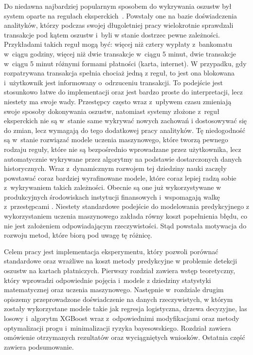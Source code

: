 \documentclass[inzynierska]{pwr_wmat_praca_dyplomowa}
\theoremstyle{plain}
\numberwithin{theorem}{chapter}
\theoremstyle{definition}
\numberwithin{theorem}{chapter}
\begin{document}
Do niedawna najbardziej popularnym sposobem do wykrywania oszustw był system oparte na regułach eksperckich~\cite{bahnsen_presentation}. Powstały one na bazie doświadczenia analityków, którzy podczas swojej długoletniej pracy wielokrotnie sprawdzali transakcje pod kątem oszustw i~byli w stanie dostrzec pewne zależności. Przykładami takich reguł mogą być: więcej niż cztery wypłaty z~bankomatu w~ciągu godziny, więcej niż dwie transakcje w~ciągu 5 minut, dwie transakcje w~ciągu 5 minut różnymi formami płatności (karta, internet). W przypadku, gdy rozpatrywana transakcja spełnia chociaż jedną z reguł, to jest ona blokowana i~użytkownik jest informowany o~odrzuceniu transakcji. To podejście jest stosunkowo łatwe do implementacji oraz jest bardzo proste do interpretacji, lecz niestety ma swoje wady. Przestępcy często wraz z~upływem czasu zmieniają swoje sposoby dokonywania oszustw, natomiast systemy złożone z~reguł eksperckich nie są w~stanie same wykrywać nowych zachowań i dostosowywać się do zmian, lecz wymagają do tego dodatkowej pracy analityków. Tę niedogodność są w~stanie rozwiązać modele uczenia maszynowego, które tworzą pewnego rodzaju reguły, które nie są bezpośrednio wprowadzane przez użytkownika, lecz automatycznie wykrywane przez algorytmy na podstawie dostarczonych danych historycznych. Wraz z~dynamicznym rozwojem tej dziedziny nauki zaczęły powstawać coraz bardziej wyrafinowane modele, które coraz lepiej radzą sobie z~wykrywaniem takich zależności. Obecnie są one już wykorzystywane w produkcyjnych środowiskach instytucji finansowych i~wspomagają walkę z~przestępcami \cite{practitioner_perspective}. Niestety standardowe podejście do modelowania predykcyjnego z wykorzystaniem uczenia maszynowego zakłada równy koszt popełnienia błędu, co nie jest założeniem odpowiadającym rzeczywistości. Stąd powstała motywacja do rozwoju metod, które biorą pod uwagę tę różnicę.

Celem pracy jest implementacja eksperymentu, który pozwoli porównać standardowe oraz wrażliwe na koszt metody predykcyjne w problemie detekcji oszustw na kartach płatniczych. Pierwszy rozdział zawiera wstęp teoretyczny, który wprowadzi odpowiednie pojęcia i~modele z dziedziny statystyki matematycznej oraz uczenia maszynowego. Następnie w~rozdziale drugim opiszemy przeprowadzone doświadczenie na danych rzeczywistych, w którym zostały wykorzystane modele takie jak regresja logistyczna, drzewa decyzyjne, las losowy i~algorytm XGBoost wraz z~odpowiednimi modyfikacjami oraz metody optymalizacji progu i~minimalizacji ryzyka bayesowskiego. Rozdział zawiera omówienie otrzymanych rezultatów oraz wyciągniętych wniosków. Ostatnia część zawiera podsumowanie.
\end{document}
